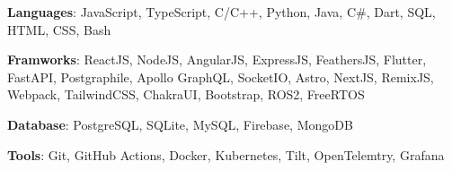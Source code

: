 \textbf{Languages}: JavaScript, TypeScript, C/C++, Python, Java, C\#, Dart, SQL, HTML, CSS, Bash \par
\textbf{Framworks}: ReactJS, NodeJS, AngularJS, ExpressJS, FeathersJS, Flutter, FastAPI, Postgraphile, Apollo GraphQL, SocketIO, Astro, NextJS, RemixJS, Webpack, TailwindCSS, ChakraUI, Bootstrap, ROS2, FreeRTOS \par
\textbf{Database}: PostgreSQL, SQLite, MySQL, Firebase, MongoDB \par
\textbf{Tools}: Git, GitHub Actions, Docker, Kubernetes, Tilt, OpenTelemtry, Grafana 